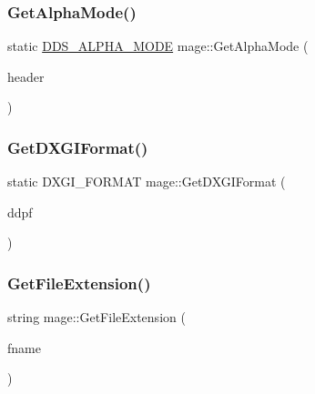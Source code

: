 \subsubsection{\texorpdfstring{Get\+Alpha\+Mode()}{GetAlphaMode()}}
{\footnotesize\ttfamily static \hyperlink{namespacemage_a0c586a2bad862f4858900ca121ca80c2}{D\+D\+S\+\_\+\+A\+L\+P\+H\+A\+\_\+\+M\+O\+DE} mage\+::\+Get\+Alpha\+Mode (\begin{DoxyParamCaption}\item[{\+\_\+\+In\+\_\+ const \hyperlink{structmage_1_1_d_d_s___h_e_a_d_e_r}{D\+D\+S\+\_\+\+H\+E\+A\+D\+ER} $\ast$}]{header }\end{DoxyParamCaption})\hspace{0.3cm}{\ttfamily [static]}}

\hypertarget{namespacemage_a4fecf9823aec7c5ba078acf6bd73f983}{}\label{namespacemage_a4fecf9823aec7c5ba078acf6bd73f983} 
\subsubsection{\texorpdfstring{Get\+D\+X\+G\+I\+Format()}{GetDXGIFormat()}}
{\footnotesize\ttfamily static D\+X\+G\+I\+\_\+\+F\+O\+R\+M\+AT mage\+::\+Get\+D\+X\+G\+I\+Format (\begin{DoxyParamCaption}\item[{const \hyperlink{structmage_1_1_d_d_s___p_i_x_e_l_f_o_r_m_a_t}{D\+D\+S\+\_\+\+P\+I\+X\+E\+L\+F\+O\+R\+M\+AT} \&}]{ddpf }\end{DoxyParamCaption})\hspace{0.3cm}{\ttfamily [static]}}

\hypertarget{namespacemage_aec46035d0a6e15632a44ac88619fb675}{}\label{namespacemage_aec46035d0a6e15632a44ac88619fb675} 
\subsubsection{\texorpdfstring{Get\+File\+Extension()}{GetFileExtension()}}
{\footnotesize\ttfamily string mage\+::\+Get\+File\+Extension (\begin{DoxyParamCaption}\item[{const string \&}]{fname }\end{DoxyParamCaption})}

\hypertarget{namespacemage_a7b67bb6f38f3e787fb3561d236b88bd2}{}\label{namespacemage_a7b67bb6f38f3e787fb3561d236b88bd2} 
